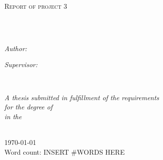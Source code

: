 \documentclass[
11pt, %
oneside, %
english, %
doublespacing,
headsepline, %
]{MastersDoctoralThesis} %
\author{Felicia \textsc{Burtscher}} %
\begin{document}
\frontmatter %

\pagestyle{plain} %


\begin{titlepage}
\begin{center}

\vspace*{.06\textheight}
{\scshape\LARGE \univname\par}\vspace{1.5cm} %
\textsc{\Large Report of project 3}\\[0.5cm] %

\HRule \\[0.4cm] %
{\huge \bfseries \ttitle\par}\vspace{0.4cm} %
\HRule \\[1.5cm] %
 
\begin{minipage}[t]{0.4\textwidth}
\begin{flushleft} \large
\emph{Author:}\\
\href{http://www.johnsmith.com}{\authorname} %
\end{flushleft}
\end{minipage}
\begin{minipage}[t]{0.4\textwidth}
\begin{flushright} \large
\emph{Supervisor:} \\
\href{http://www.jamessmith.com}{\supname} %
\end{flushright}
\end{minipage}\\[3cm]
 
\vfill

\large \textit{A thesis submitted in fulfillment of the requirements\\ for the degree of \degreename}\\[0.3cm] %
\textit{in the}\\[0.4cm]
 \deptname\\[1cm]
\vfill

{\large \today}\\[2cm] %
 
 {Word count: INSERT \#WORDS HERE}\\[2cm] %
 
\vfill
\end{center}
\end{titlepage}
\end{document}
